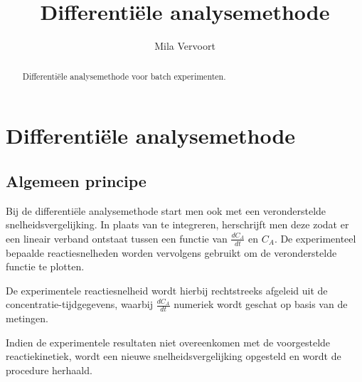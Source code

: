 \documentclass{ximera}
\title{Differentiële analysemethode}
\author{Mila Vervoort}
\begin{document}
\begin{abstract}
    Differentiële analysemethode voor batch experimenten.
\end{abstract}
\maketitle
\label{xim:Differentiële analysemethode}


\section*{Differentiële analysemethode}
\label{Differentiele analyse methode}

\subsection*{Algemeen principe}

Bij de differentiële analysemethode start men ook met een veronderstelde snelheidsvergelijking. In plaats van te integreren, herschrijft men deze zodat er een lineair verband ontstaat tussen een functie van $\frac{dC_A}{dt}$ en $C_A$. De experimenteel bepaalde reactiesnelheden worden vervolgens gebruikt om de veronderstelde functie te plotten.

De experimentele reactiesnelheid wordt hierbij rechtstreeks afgeleid uit de concentratie-tijdgegevens, waarbij $\frac{dC_A}{dt}$ numeriek wordt geschat op basis van de metingen.

Indien de experimentele resultaten niet overeenkomen met de voorgestelde reactiekinetiek, wordt een nieuwe snelheidsvergelijking opgesteld en wordt de procedure herhaald.
\end{document}
